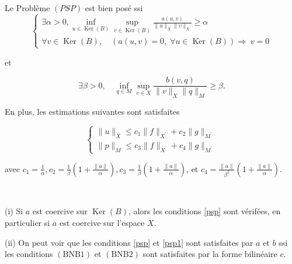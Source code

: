 \begin{theorem}\label{pointselle}
	
	
	 Le Problème $(PSP)$ est bien posé ssi 
\begin{equation}\label{psp}
\left\{\begin{array}{l}
	\exists \alpha>0, \displaystyle \inf _{u \in \operatorname{Ker}(B)} \sup _{v \in \operatorname{Ker}(B)} \frac{a(u, v)}{\|u\|_{X}\|v\|_{X}} \geq \alpha \\
	\forall v \in \operatorname{Ker}(B), \quad( a(u, v)=0, \; \forall u \in \operatorname{Ker}(B)) \Rightarrow \; v=0
\end{array}\right.
\end{equation}

et 

\begin{equation}\label{psp1}
\exists \beta>0, \quad \inf _{q \in M} \sup _{v \in X} \frac{b(v, q)}{\|v\|_{X}\|q\|_{M}} \geq \beta.
\end{equation}

En plus, les estimations suivantes sont satisfaites

$$
\left\{\begin{array}{l}
	\|u\|_{X} \leq c_{1}\|f\|_{X^{\prime}}+c_{2}\|g\|_{M^{\prime}} \\
	\|p\|_{M} \leq c_{3}\|f\|_{X^{\prime}}+c_{4}\|g\|_{M^{\prime}}
\end{array}\right.
$$

avec  $c_{1}=\frac{1}{\alpha}, c_{2}=\frac{1}{\beta}\left(1+\frac{\|a\|}{\alpha}\right), c_{3}=\frac{1}{\beta}\left(1+\frac{\|a\|}{\alpha}\right)$, et  $c_{4}=\frac{\|a\|}{\beta^{2}}\left(1+\frac{\|a\|}{\alpha}\right)$.

\end{theorem}


\begin{remark}\
	
	
	
(i)  Si  $a$ est  coercive sur  $\operatorname{Ker}(B)$,  alors les  conditions  \eqref{psp} sont vérifées, en particulier si  $a$ est  coercive sur l'espace  $X$.




(ii)  On peut voir que les conditions \eqref{psp} et \eqref{psp1} sont satisfaites par $a$ et $b$ ssi  les  conditions  $(\mathrm{BNB} 1)$ et $(\mathrm{BNB} 2)$ sont satisfaites par la forme bilinéaire $c$. 


\end{remark}



